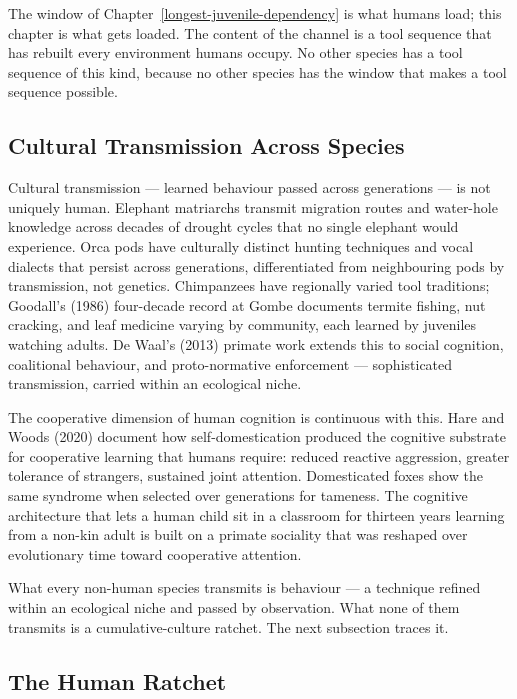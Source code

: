 \documentclass[12pt,letterpaper]{article}
\begin{document}
The window of Chapter~\ref{longest-juvenile-dependency} is what humans
load; this chapter is what gets loaded. The content of the channel
is a tool sequence that has rebuilt every environment humans occupy.
No other species has a tool sequence of this kind, because no other
species has the window that makes a tool sequence possible.

\subsection{Cultural Transmission Across Species}\label{cultural-transmission-across-species}

Cultural transmission --- learned behaviour passed across generations
--- is not uniquely human. Elephant matriarchs transmit migration
routes and water-hole knowledge across decades of drought cycles that
no single elephant would experience. Orca pods have culturally
distinct hunting techniques and vocal dialects that persist across
generations, differentiated from neighbouring pods by transmission,
not genetics. Chimpanzees have regionally varied tool traditions;
Goodall's (1986) four-decade record at Gombe documents termite
fishing, nut cracking, and leaf medicine varying by community, each
learned by juveniles watching adults. De Waal's (2013) primate work
extends this to social cognition, coalitional behaviour, and
proto-normative enforcement --- sophisticated transmission, carried
within an ecological niche.

The cooperative dimension of human cognition is continuous with this.
Hare and Woods (2020) document how self-domestication produced the
cognitive substrate for cooperative learning that humans require:
reduced reactive aggression, greater tolerance of strangers, sustained
joint attention. Domesticated foxes show the same syndrome when
selected over generations for tameness. The cognitive architecture
that lets a human child sit in a classroom for thirteen years
learning from a non-kin adult is built on a primate sociality that
was reshaped over evolutionary time toward cooperative attention.

What every non-human species transmits is behaviour --- a technique
refined within an ecological niche and passed by observation. What
none of them transmits is a cumulative-culture ratchet. The next
subsection traces it.

\subsection{The Human Ratchet}\label{the-human-ratchet}
\end{document}
